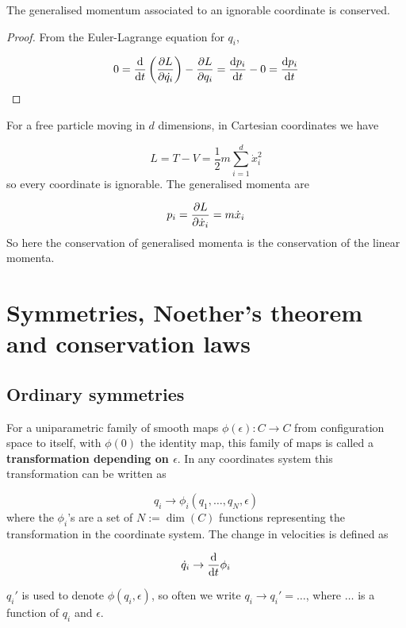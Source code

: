 \begin{proposition}\label{prop:generalisedIgnorableMomentumConserved}
	The generalised momentum associated to an ignorable coordinate is conserved.
\end{proposition}

\begin{proof}
	From the Euler-Lagrange equation for $q_i$,

	\[ 0 = \diff{}{t} \left( \diffp{L}{\dot{q_i}} \right) - \diffp{L}{q_i} = \diff{p_i}{t} - 0 = \diff{p_i}{t} \]
\end{proof}

\begin{example}
	For a free particle moving in $d$ dimensions, in Cartesian coordinates we have

	\[ L = T - V = \frac{1}{2} m \sum_{i = 1}^d \dot{x}_i^2 \]
	so every coordinate is ignorable. The generalised momenta are

	\[ p_i = \diffp{L}{\dot{x}_i} = m \dot{x}_i \]
	So here the conservation of generalised momenta is the conservation of the linear momenta.
\end{example}

\section{Symmetries, Noether's theorem and conservation laws}

\subsection{Ordinary symmetries}

\begin{definition}
	For a uniparametric family of smooth maps $\phi(\epsilon): C \rightarrow C$ from configuration space to itself, with $\phi(0)$ the identity map, this family of maps is called a \textbf{transformation depending on $\epsilon$}. In any coordinates system this transformation can be written as

	\[ q_i \rightarrow \phi_i(q_1, \dots, q_N, \epsilon) \]
	where the $\phi_i$'s are a set of $N := \dim(C)$ functions representing the transformation in the coordinate system. The change in velocities is defined as

	\[ \dot{q}_i \rightarrow \diff{}{t} \phi_i \]
\end{definition}

\begin{remark}
	$q_i'$ is used to denote $\phi(q_i, \epsilon)$, so often we write $q_i \rightarrow q_i' = \dots$, where $\dots$ is a function of $q_i$ and $\epsilon$.
\end{remark}

